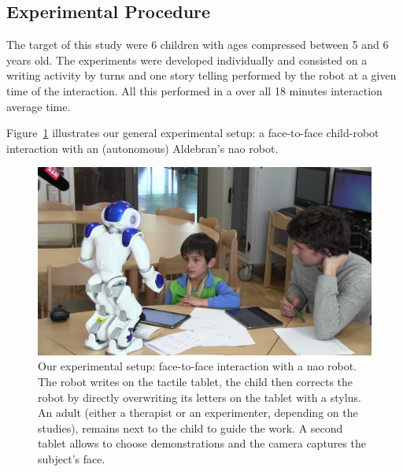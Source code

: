 \documentclass{sig-alternate}
\begin{document}



\subsection{Experimental Procedure}

The target of this study were 6 children with ages compressed between 5 and 6
years old. The experiments were developed individually and consisted on a
writing activity by turns and one story telling performed by the robot at a
given time of the interaction. All this performed in a over all 18 minutes
interaction average time.

Figure~\ref{fig:realSetup} illustrates our general experimental setup: a
face-to-face child-robot interaction with an (autonomous) Aldebran's {\sc nao}
robot.

\begin{figure}[h!]
    \centering
    \includegraphics[width=1\columnwidth]{realSetup}
    \caption{\small Our experimental setup: face-to-face interaction with a {\sc
            nao} robot.  The robot writes on the tactile tablet, the child then
            corrects the robot by directly overwriting its letters on the tablet
            with a stylus. An adult (either a therapist or an experimenter,
            depending on the studies), remains next to the child to guide the work. 
            A second tablet allows to choose demonstrations and the camera captures the subject's face.}
    \label{fig:realSetup}
\end{figure}
\end{document}
